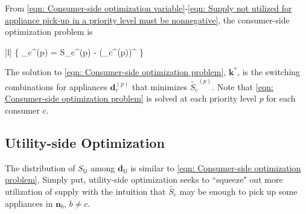 \documentclass[journal, a4paper]{IEEEtran}
\begin{document}
From
\eqref{eqn: Consumer-side optimization variable}-\eqref{eqn: Supply not utilized for appliance pick-up in a priority level must be nonnegative},
the consumer-side optimization problem is
\begin{mini!}|l|
	{  }
	{ \left\{ _{c}^{\left(p\right)} = S_{c}^{\left(p\right)} - \left(_{c}^{\left(p\right)}\right)^{\intercal}  \right\} }
	{\label{eqn: Consumer-side optimization problem}}
	{}{}
\end{mini!}
The solution to \eqref{eqn: Consumer-side optimization problem}, $\mathbf{k}^{\ast}$,
is the switching combinations for appliances $\mathbf{d}_{c}^{\left(p\right)}$
that minimizes $\tilde{S_{c}}^{\left(p\right)}$.
Note that \eqref{eqn: Consumer-side optimization problem} is solved at each priority level $p$ for each consumer $c$.

\subsection{Utility-side Optimization}
\label{subsec: I. Utility-side Optimization}

The distribution of $S_{\mathsf{U}}$ among $\mathbf{d}_{\mathsf{U}}$ is similar to
\eqref{eqn: Consumer-side optimization problem}.
Simply put, utility-side optimization seeks to ``squeeze" out more utilization of supply
with the intuition that $\tilde{S_{c}}$ may be enough to pick up some appliances in $\mathbf{n}_{b}$, $b \neq c$.
\end{document}
